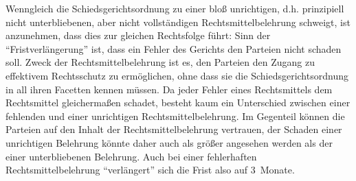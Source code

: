 Wenngleich die Schiedsgerichtsordnung zu einer bloß unrichtigen, d.h. prinzipiell nicht unterbliebenen, aber nicht vollständigen Rechtsmittelbelehrung schweigt, ist anzunehmen, dass dies zur gleichen Rechtsfolge führt:
Sinn der \enquote{Fristverlängerung} ist, dass ein Fehler des Gerichts den Parteien nicht schaden soll.
Zweck der Rechtsmittelbelehrung ist es, den Parteien den Zugang zu effektivem Rechtsschutz zu ermöglichen, ohne dass sie die Schiedsgerichtsordnung in all ihren Facetten kennen müssen.
Da jeder Fehler eines Rechtsmittels dem Rechtsmittel gleichermaßen schadet, besteht kaum ein Unterschied zwischen einer fehlenden und einer unrichtigen Rechtsmittelbelehrung.
Im Gegenteil können die Parteien auf den Inhalt der Rechtsmittelbelehrung vertrauen, der Schaden einer unrichtigen Belehrung könnte daher auch als größer angesehen werden als der einer unterbliebenen Belehrung.
Auch bei einer fehlerhaften Rechtsmittelbelehrung \enquote{verlängert} sich die Frist also auf 3~Monate.


\chapterbib
